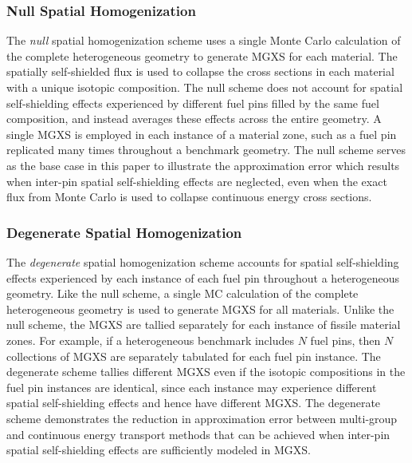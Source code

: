 \subsubsection{Null Spatial Homogenization}
\label{subsubsec:homogenize-null}

The \textit{null} spatial homogenization scheme uses a single Monte Carlo calculation of the complete heterogeneous geometry to generate MGXS for each material. The spatially self-shielded flux is used to collapse the cross sections in each material with a unique isotopic composition. The null scheme does not account for spatial self-shielding effects experienced by different fuel pins filled by the same fuel composition, and instead averages these effects across the entire geometry. A single MGXS is employed in each instance of a material zone, such as a fuel pin replicated many times throughout a benchmark geometry. The null scheme serves as the base case in this paper to illustrate the approximation error which results when inter-pin spatial self-shielding effects are neglected, even when the exact flux from Monte Carlo is used to collapse continuous energy cross sections.


\subsubsection{Degenerate Spatial Homogenization}
\label{subsubsec:homogenize-degenerate}

The \textit{degenerate} spatial homogenization scheme accounts for spatial self-shielding effects experienced by each instance of each fuel pin throughout a heterogeneous geometry. Like the null scheme, a single MC calculation of the complete heterogeneous geometry is used to generate MGXS for all materials. Unlike the null scheme, the MGXS are tallied separately for each instance of fissile material zones. For example, if a heterogeneous benchmark includes $N$ fuel pins, then $N$ collections of MGXS are separately tabulated for each fuel pin instance. The degenerate scheme tallies different MGXS even if the isotopic compositions in the fuel pin instances are identical, since each instance may experience different spatial self-shielding effects and hence have different MGXS. The degenerate scheme demonstrates the reduction in approximation error between multi-group and continuous energy transport methods that can be achieved when inter-pin spatial self-shielding effects are sufficiently modeled in MGXS.
